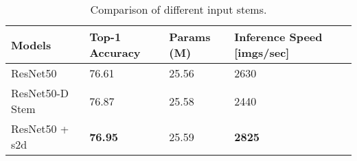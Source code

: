 \begin{table}[h!]
    \centering
    \begin{tabular}{|p{3.1cm}|p{2.7cm}|p{2cm}|p{2.8cm}|p{2cm}|}
    \hline
    Models & Top-1 Accuracy & Params (M) & Inference Speed {[}imgs/sec{]} \\ \hline
    ResNet50         & 76.61 & 25.56 & 2630 \\ 
    ResNet50-D Stem  & 76.87 & 25.58 & 2440 \\ 
    ResNet50 + s2d   & \textbf{76.95} & 25.59 & \textbf{2825} \\ \hline
    \end{tabular}
    \caption{Comparison of different input stems.}
    \label{table:stem_comparison}
    \end{table}